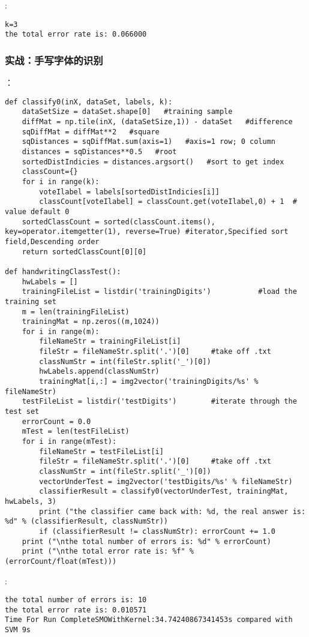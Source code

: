 :
\begin{lstlisting}
k=3
the total error rate is: 0.066000
\end{lstlisting}

\subsubsection{实战：手写字体的识别}
：
\begin{lstlisting}
def classify0(inX, dataSet, labels, k):
    dataSetSize = dataSet.shape[0]   #training sample
    diffMat = np.tile(inX, (dataSetSize,1)) - dataSet   #difference
    sqDiffMat = diffMat**2   #square
    sqDistances = sqDiffMat.sum(axis=1)   #axis=1 row; 0 column
    distances = sqDistances**0.5   #root
    sortedDistIndicies = distances.argsort()   #sort to get index
    classCount={}
    for i in range(k):
        voteIlabel = labels[sortedDistIndicies[i]]
        classCount[voteIlabel] = classCount.get(voteIlabel,0) + 1  # value default 0
    sortedClassCount = sorted(classCount.items(), key=operator.itemgetter(1), reverse=True) #iterator,Specified sort field,Descending order
    return sortedClassCount[0][0]

def handwritingClassTest():
    hwLabels = []
    trainingFileList = listdir('trainingDigits')           #load the training set
    m = len(trainingFileList)
    trainingMat = np.zeros((m,1024))
    for i in range(m):
        fileNameStr = trainingFileList[i]
        fileStr = fileNameStr.split('.')[0]     #take off .txt
        classNumStr = int(fileStr.split('_')[0])
        hwLabels.append(classNumStr)
        trainingMat[i,:] = img2vector('trainingDigits/%s' % fileNameStr)
    testFileList = listdir('testDigits')        #iterate through the test set
    errorCount = 0.0
    mTest = len(testFileList)
    for i in range(mTest):
        fileNameStr = testFileList[i]
        fileStr = fileNameStr.split('.')[0]     #take off .txt
        classNumStr = int(fileStr.split('_')[0])
        vectorUnderTest = img2vector('testDigits/%s' % fileNameStr)
        classifierResult = classify0(vectorUnderTest, trainingMat, hwLabels, 3)
        print ("the classifier came back with: %d, the real answer is: %d" % (classifierResult, classNumStr))
        if (classifierResult != classNumStr): errorCount += 1.0
    print ("\nthe total number of errors is: %d" % errorCount)
    print ("\nthe total error rate is: %f" % (errorCount/float(mTest)))
\end{lstlisting}
:
\begin{lstlisting}
the total number of errors is: 10
the total error rate is: 0.010571
Time For Run CompleteSMOWithKernel:34.74240867341453s compared with SVM 9s
\end{lstlisting}

